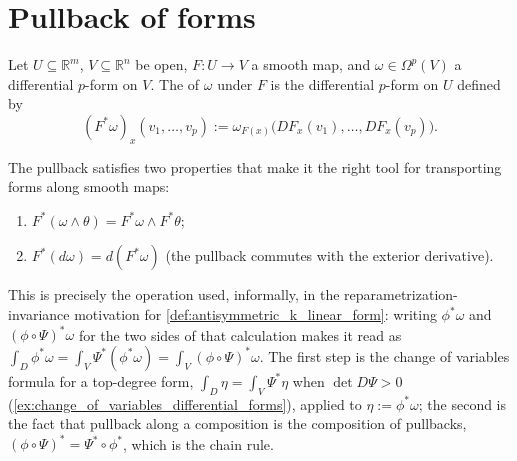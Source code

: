 

\section{Pullback of forms}
\label{sec:pullback_of_forms}

\begin{definition}
\label{def:pullback_of_forms}
Let $U \subseteq \mathbb{R}^m$, $V \subseteq \mathbb{R}^n$ be open, $F : U \to V$ a smooth
map, and $\omega \in \Omega^p(V)$ a differential $p$-form on $V$. The 
 of $\omega$ under $F$ is the differential $p$-form on $U$
defined by
\[(F^*\omega)_x(v_1,\ldots,v_p) := \omega_{F(x)}\big(DF_x(v_1),\ldots,DF_x(v_p)\big).\]
\end{definition}


The pullback satisfies two properties that make it the right tool for transporting forms
along smooth maps:
\begin{enumerate}[label=\textbf{(\alph*)}]
  \item $F^*(\omega\wedge\theta) = F^*\omega \wedge F^*\theta$;
  \item $F^*(d\omega) = d(F^*\omega)$ (the pullback commutes with the exterior derivative).
\end{enumerate}

\begin{ainote}
This is precisely the operation used, informally, in the reparametrization-invariance
motivation for \cref{def:antisymmetric_k_linear_form}: writing $\phi^*\omega$ and
$(\phi\circ\Psi)^*\omega$ for the two sides of that calculation makes it read as $\int_D
\phi^*\omega = \int_V \Psi^*(\phi^*\omega) = \int_V (\phi\circ\Psi)^*\omega$. The first step is
the change of variables formula for a top-degree form, $\int_D\eta = \int_V\Psi^*\eta$ when
$\det D\Psi > 0$ (\cref{ex:change_of_variables_differential_forms}), applied to
$\eta := \phi^*\omega$; the second is the fact that pullback along a composition is the
composition of pullbacks, $(\phi\circ\Psi)^* = \Psi^*\circ\phi^*$, which is the chain rule.
\end{ainote}

